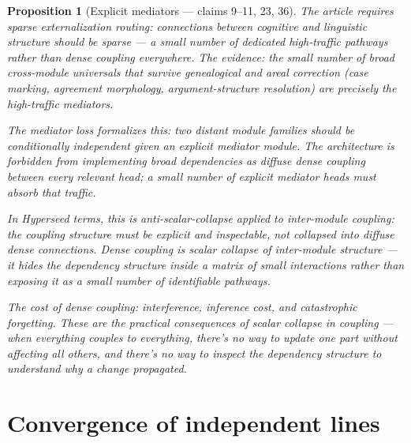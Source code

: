 \documentclass[11pt,a4paper]{article}
\newtheorem{proposition}[definition]{Proposition}
\begin{document}
\begin{proposition}[Explicit mediators --- claims 9--11, 23, 36]
\label{prop:sparse}
The article requires sparse externalization routing: connections
between cognitive and linguistic structure should be sparse --- a
small number of dedicated high-traffic pathways rather than dense
coupling everywhere. The evidence: the small number of broad
cross-module universals that survive genealogical and areal
correction (case marking, agreement morphology, argument-structure
resolution) are precisely the high-traffic mediators.

The mediator loss formalizes this: two distant module families should
be conditionally independent given an explicit mediator module. The
architecture is forbidden from implementing broad dependencies as
diffuse dense coupling between every relevant head; a small number of
explicit mediator heads must absorb that traffic.

In Hyperseed terms, this is \emph{anti-scalar-collapse applied to
inter-module coupling}: the coupling structure must be explicit and
inspectable, not collapsed into diffuse dense connections. Dense
coupling is scalar collapse of inter-module structure --- it hides
the dependency structure inside a matrix of small interactions
rather than exposing it as a small number of identifiable pathways.

The cost of dense coupling: interference, inference cost, and
catastrophic forgetting. These are the practical consequences of
scalar collapse in coupling --- when everything couples to everything,
there's no way to update one part without affecting all others, and
there's no way to inspect the dependency structure to understand why
a change propagated.
\end{proposition}


\section{Convergence of independent lines}
\label{sec:convergence}
\end{document}
